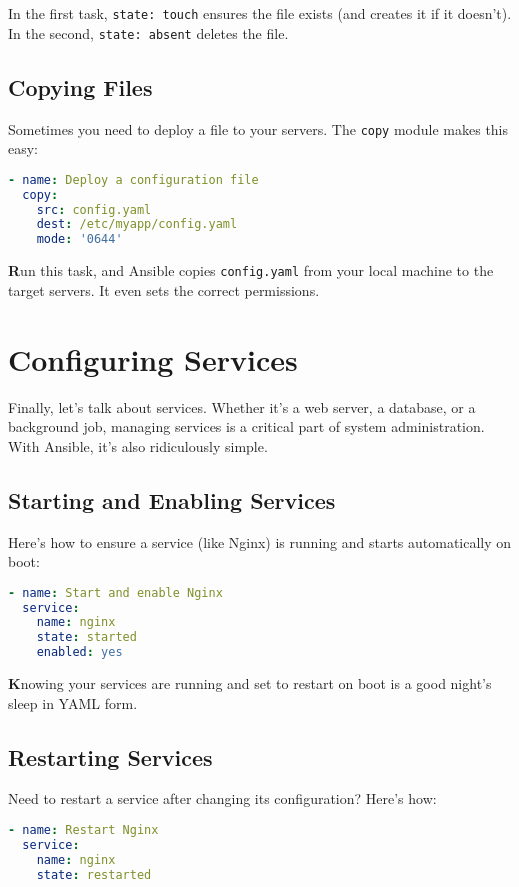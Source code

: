 In the first task, \texttt{state: touch} ensures the file exists (and creates it if it doesn't). In the second, \texttt{state: absent} deletes the file.

\subsection{Copying Files}

Sometimes you need to deploy a file to your servers. The \texttt{copy} module makes this easy:
\begin{lstlisting}[language=yaml, caption=Copying a File]
- name: Deploy a configuration file
  copy:
    src: config.yaml
    dest: /etc/myapp/config.yaml
    mode: '0644'
\end{lstlisting}

\textbf{R}un this task, and Ansible copies \texttt{config.yaml} from your local machine to the target servers. It even sets the correct permissions.

\section{Configuring Services}

Finally, let's talk about services. Whether it's a web server, a database, or a background job, managing services is a critical part of system administration. With Ansible, it's also ridiculously simple.

\subsection{Starting and Enabling Services}

Here's how to ensure a service (like Nginx) is running and starts automatically on boot:
\begin{lstlisting}[language=yaml, caption=Starting and Enabling a Service]
- name: Start and enable Nginx
  service:
    name: nginx
    state: started
    enabled: yes
\end{lstlisting}

\textbf{K}nowing your services are running and set to restart on boot is a good night's sleep in YAML form.

\subsection{Restarting Services}

Need to restart a service after changing its configuration? Here's how:
\begin{lstlisting}[language=yaml, caption=Restarting a Service]
- name: Restart Nginx
  service:
    name: nginx
    state: restarted
\end{lstlisting}

